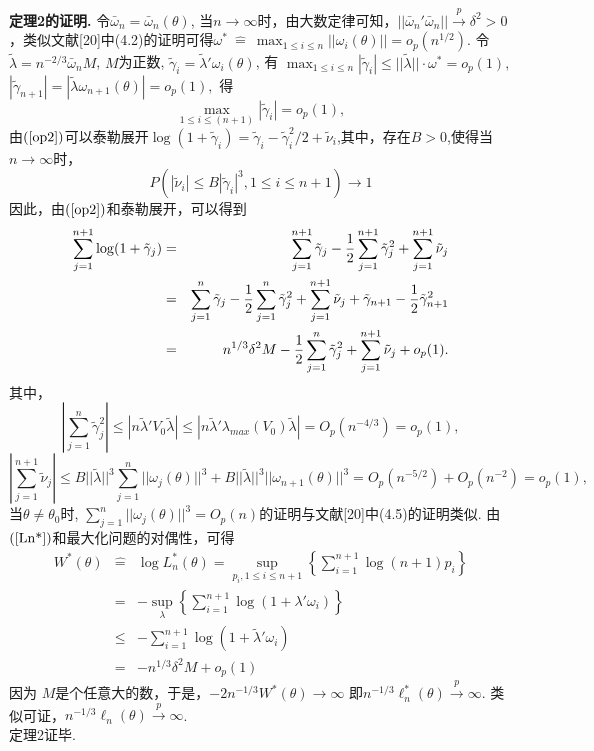 \documentclass[onecolumn]{ctexart}	%
\begin{document}
{\bf 定理2的证明. }令$\bar{\omega}_n=\bar{\omega}_n(\theta)$, 当$n \to \infty$时，由大数定律可知，$||\bar{\omega}_n'\bar{\omega}_n||\stackrel{p}{\longrightarrow}\delta^2>0$，类似文献[20]中(4.2)的证明可得$\omega^* \ \hat{=}\  \max_{ 1\leq i\leq n} ||  \omega_i(\theta)  || =o_p(n^{1/2}) $.
 令
$\tilde\lambda=n^{-2/3}\bar{\omega}_nM$, $M$为正数, 
$\tilde\gamma_i=\tilde\lambda'\omega_i(\theta)$, 
有
$\max_{ 1\leq i\leq n}|  \tilde\gamma_i | \le  ||\tilde\lambda || \cdot \omega^*=o_p(1),$
$|  \tilde\gamma_{n+1} | =  |\tilde\lambda\omega_{n+1}(\theta)|=o_p(1),$
得
\begin{equation}
\max_{ 1\leq i\leq (n+1)} |  \tilde\gamma_i |=o_p(1) , \label{op2}
\end{equation}
由$\rm(\ref{op2}) $可以泰勒展开$\log(1+ \tilde\gamma_i)= \tilde\gamma_i- \tilde\gamma_i^2/2+ \tilde\nu_i$,其中，存在$B>0$,使得当$n \to \infty$时，
$$P(| \tilde\nu_i| \le B| \tilde\gamma_i|^3,1 \le i \le n+1) \to 1$$
因此，由$\rm(\ref{op2}) $和泰勒展开，可以得到
\begin{eqnarray*}
\sum_{j=1}^{n+1} \log(1+\tilde\gamma_j)& = &\sum_{j=1}^{n+1}\tilde\gamma_j-{1 \over 2}\sum_{j=1}^{n+1}\tilde\gamma_j^2+\sum_{j=1}^{n+1}\tilde\nu_j\\
& = & \sum_{j=1}^{n}\tilde\gamma_j-{1 \over 2}\sum_{j=1}^{n}\tilde\gamma_j^2+\sum_{j=1}^{n+1}\tilde\nu_j+\tilde\gamma_{n+1}-{1 \over 2}\tilde\gamma^2_{n+1}\\
& = & n^{1/3}\delta^2M-{1 \over 2}\sum_{j=1}^{n}\tilde\gamma_j^2+\sum_{j=1}^{n+1}\tilde\nu_j +o_p(1).
\end{eqnarray*}
其中，
$$|\sum_{j=1}^{n}\tilde\gamma_j^2|\le |n\tilde\lambda'V_0\tilde\lambda|\le |n\tilde\lambda'\lambda_{max} (V_0)\tilde\lambda|=O_p(n^{-4/3}) =o_p(1),$$
$$|\sum_{j=1}^{n+1}\tilde\nu_j|  \leq B ||\tilde\lambda||^3\sum_{j=1}^{n}||\omega_{j}(\theta)||^3+B ||\tilde\lambda||^3||\omega_{n+1}(\theta)||^3 =O_p(n^{-5/2})+O_p(n^{-2})=o_p(1),$$
当$\theta \neq \theta_0$时, $ \sum_{j=1}^{n}||\omega_{j}(\theta)||^3 =O_p(n) $的证明与文献[20]中(4.5)的证明类似.
由$\rm(\ref{Ln*}) $和最大化问题的对偶性，可得
\begin{eqnarray*}
W^*(\theta)&\hat{=}&  \log L_n^*(\theta)=\sup_{p_i, 1\leq i\leq n+1}\left \{\sum\limits^{n+1}_{i=1}\log(n+1)p_i\right \}\\
                              & =&  -\sup\limits_{\lambda}\left \{ \sum\limits^{n+1}_{i=1}\log (1+\lambda'\omega_i) \right \}\\
                              &\le& -\sum\limits^{n+1}_{i=1}\log (1+\tilde\lambda'\omega_i) \\
                               &=&  -n^{1/3}\delta^2M+o_p(1)
\end{eqnarray*}
因为 $M$是个任意大的数，于是，$-2n^{-1/3}W^*(\theta)\to \infty$
即$n^{-1/3}\ell^*_n ({\theta} )   \stackrel{p}{\longrightarrow}\infty$.
类似可证，$n^{-1/3}\ell_n ({\theta} )   \stackrel{p}{\longrightarrow}\infty$.\\
定理2证毕.
\bigskip
\end{document}
